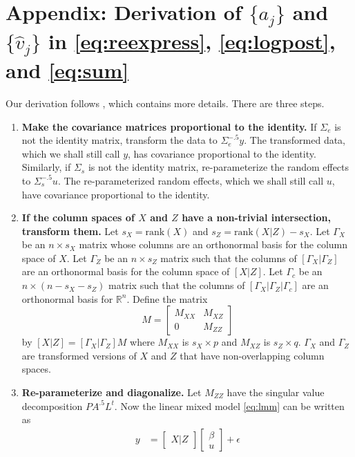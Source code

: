 \documentclass{report}
\begin{document}
\section{Appendix: Derivation of $\{a_j\}$ and $\{\hat v_j\}$ in \eqref{eq:reexpress}, \eqref{eq:logpost}, and \eqref{eq:sum}}
Our derivation follows \cite{hodges:2013},
which contains more details.  There are three steps.
\begin{enumerate}
  \item \textbf{Make the covariance matrices proportional to the identity.}  If $\Sigma_e$ is not the identity matrix,
    transform the data to $\Sigma_e^{-.5}y$.  The transformed data, which we shall still call $y$, has covariance
    proportional to the identity.  Similarly, if $\Sigma_s$ is not the identity matrix, re-parameterize the random
    effects to $\Sigma_s^{-.5}u$.  The re-parameterized random effects, which we shall still call $u$, have
    covariance proportional to the identity.
  \item \textbf{If the column spaces of $X$ and $Z$ have a non-trivial intersection, transform them.}
    Let $s_X=\text{rank}(X)$  and $s_Z=\text{rank}(X|Z) - s_X$.  Let $\Gamma_X$ be an $n \times s_X$ matrix whose
    columns are an orthonormal basis for the column space of $X$.  Let $\Gamma_Z$ be an $n \times s_Z$ matrix
    such that the columns of $\left[\Gamma_X | \Gamma_Z \right]$ are an orthonormal basis for the column space
    of $\left[X|Z\right]$.  Let $\Gamma_c$ be an $n \times (n-s_X-s_Z)$ matrix such that the columns of
    $\left[\Gamma_X | \Gamma_Z | \Gamma_c\right]$ are an orthonormal basis for $\mathbb{R}^n$.  Define the matrix
    \begin{equation*}
      M = \begin{bmatrix}
               M_{XX} & M_{XZ}\\
               0 & M_{ZZ}
             \end{bmatrix}
    \end{equation*}
    by $[X|Z] = [\Gamma_X|\Gamma_Z]M$ where $M_{XX}$ is $s_X \times p$ and $M_{XZ}$ is $s_Z \times q$.
    $\Gamma_X$ and $\Gamma_Z$ are transformed versions of $X$ and $Z$ that have non-overlapping
    column spaces.
  \item \textbf{Re-parameterize and diagonalize.}  Let $M_{ZZ}$ have the singular value decomposition
    $PA^{.5}L^t$.  Now the linear mixed model \eqref{eq:lmm} can be written as
    \begin{equation*}
      \begin{split}
        y &= \begin{bmatrix} X | Z \end{bmatrix} \begin{bmatrix} \beta \\ u \end{bmatrix} + \epsilon\\

\end{split}
\end{equation*}
\end{enumerate}
\end{document}
